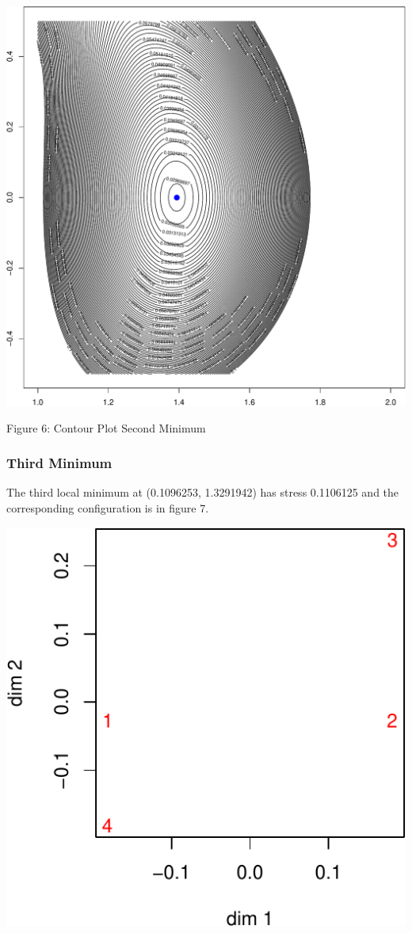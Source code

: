 \documentclass[
  12pt,
]{article}
\begin{document}
\begin{center}\includegraphics{twoPoints_files/figure-latex/contour_second_minimum-1} \end{center}

Figure 6: Contour Plot Second Minimum

\subsubsection{Third Minimum}\label{third-minimum}

The third local minimum at (0.1096253, 1.3291942) has stress 0.1106125 and the corresponding configuration is in figure 7.

\begin{center}\includegraphics{twoPoints_files/figure-latex/configuration_third_minimum-1} \end{center}
\end{document}
